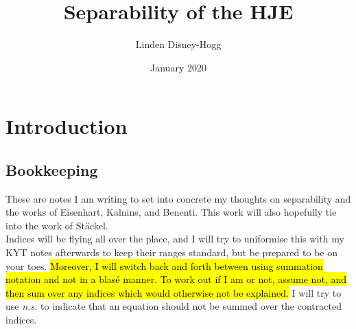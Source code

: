 \documentclass{article}
\title{Separability of the HJE}
\author{Linden Disney-Hogg}
\date{January 2020}
\begin{document}
\maketitle
\tableofcontents

\section{Introduction}
\subsection{Bookkeeping}
These are notes I am writing to set into concrete my thoughts on separability and the works of Eisenhart, Kalnins, and Benenti. This work will also hopefully tie into the work of St\"ackel. \\
Indices will be flying all over the place, and I will try to uniformise this with my KYT notes afterwards to keep their ranges standard, but be prepared to be on your toes. \hl{Moreover, I will switch back and forth between using summation notation and not in a blas\'e manner. To work out if I am or not, assume not, and then sum over any indices which would otherwise not be explained.} I will try to use \textit{n.s.} to indicate that an equation should not be summed over the contracted indices.  
\end{document}

